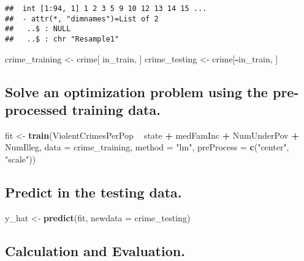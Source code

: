 \documentclass[]{article}
\newenvironment{Shaded}{\begin{snugshade}}{\end{snugshade}}
\newcommand{\KeywordTok}[1]{\textcolor[rgb]{0.13,0.29,0.53}{\textbf{#1}}}
\newcommand{\DataTypeTok}[1]{\textcolor[rgb]{0.13,0.29,0.53}{#1}}
\newcommand{\StringTok}[1]{\textcolor[rgb]{0.31,0.60,0.02}{#1}}
\newcommand{\OperatorTok}[1]{\textcolor[rgb]{0.81,0.36,0.00}{\textbf{#1}}}
\newcommand{\NormalTok}[1]{#1}
\begin{document}
\begin{verbatim}
##  int [1:94, 1] 1 2 3 5 9 10 12 13 14 15 ...
##  - attr(*, "dimnames")=List of 2
##   ..$ : NULL
##   ..$ : chr "Resample1"
\end{verbatim}

\begin{Shaded}
\begin{Highlighting}[]
\NormalTok{crime_training <-}\StringTok{ }\NormalTok{crime[ in_train, ]}
\NormalTok{crime_testing  <-}\StringTok{ }\NormalTok{crime[}\OperatorTok{-}\NormalTok{in_train, ]}
\end{Highlighting}
\end{Shaded}

\subsection{Solve an optimization problem using the pre-processed
training
data.}\label{solve-an-optimization-problem-using-the-pre-processed-training-data.}

\begin{Shaded}
\begin{Highlighting}[]
\NormalTok{fit <-}\StringTok{ }\KeywordTok{train}\NormalTok{(ViolentCrimesPerPop }\OperatorTok{~}\StringTok{ }\NormalTok{state }\OperatorTok{+}\StringTok{ }\NormalTok{medFamInc }\OperatorTok{+}\StringTok{ }\NormalTok{NumUnderPov }\OperatorTok{+}\StringTok{ }\NormalTok{NumIlleg, }\DataTypeTok{data =}\NormalTok{ crime_training, }\DataTypeTok{method =} \StringTok{"lm"}\NormalTok{, }\DataTypeTok{preProcess =} \KeywordTok{c}\NormalTok{(}\StringTok{"center"}\NormalTok{, }\StringTok{"scale"}\NormalTok{))}
\end{Highlighting}
\end{Shaded}

\subsection{Predict in the testing
data.}\label{predict-in-the-testing-data.}

\begin{Shaded}
\begin{Highlighting}[]
\NormalTok{y_hat <-}\StringTok{ }\KeywordTok{predict}\NormalTok{(fit, }\DataTypeTok{newdata =}\NormalTok{ crime_testing)}
\end{Highlighting}
\end{Shaded}

\subsection{Calculation and
Evaluation.}\label{calculation-and-evaluation.}
\end{document}
